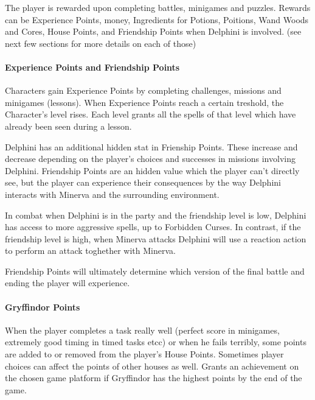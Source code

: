 The player is rewarded upon completing battles, minigames and puzzles. Rewards can be Experience Points, money, Ingredients for Potions, Poitions, Wand Woods and Cores, House Points, and Friendship Points when Delphini is involved. (see next few sections for more details on each of those)


\paragraph{Experience Points and Friendship Points}

Characters gain Experience Points by completing challenges, missions and minigames (lessons). When Experience Points reach a certain treshold, the Character's level rises. 
Each level grants all the spells of that level which have already been seen during a lesson.

Delphini has an additional hidden stat in Frienship Points. These increase and decrease depending on the player's choices and successes in missions involving Delphini. Friendship Points are an hidden value which the player can't directly see, but the player can experience their consequences by the way Delphini interacts with Minerva and the surrounding environment.

In combat when Delphini is in the party and the friendship level is low, Delphini has access to more aggressive spells, up to Forbidden Curses. In contrast, if the friendship level is high, when Minerva attacks Delphini will use a reaction action to perform an attack toghether with Minerva.

Friendship Points will ultimately determine which version of the final battle and ending the player will experience.

\paragraph{Gryffindor Points}

When the player completes a task really well (perfect score in minigames, extremely good timing in timed tasks etcc) or when he fails terribly, some points are added to or removed from the player's House Points. Sometimes player choices can affect the points of other houses as well.
Grants an achievement on the chosen game platform if Gryffindor has the highest points by the end of the game.

\pagebreak